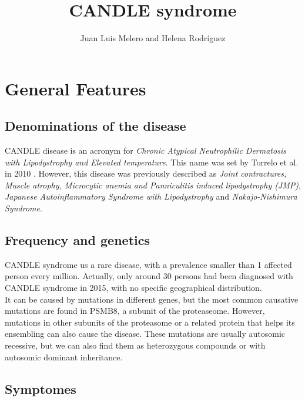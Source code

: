 \documentclass[a4paper,10pt]{report}
\title{CANDLE syndrome}
\author{Juan Luis Melero and Helena Rodríguez}
\begin{document}
\maketitle
\tableofcontents

\begin{abstract}
\end{abstract}

\chapter{General Features}

\section{Denominations of the disease}

CANDLE disease is an acronym for \textit{Chronic Atypical Neutrophilic Dermatosis with Lipodystrophy and Elevated temperature}. This name was set by Torrelo et al. in 2010 \cite{Torrelo2010}.
However, this disease was previously described as \textit{Joint contractures, Muscle atrophy, Microcytic anemia and Panniculitis induced lipodystrophy (JMP)}, \textit{Japanese Autoinflammatory Syndrome with Lipodystrophy} and \textit{Nakajo-Nishimura Syndrome}.

\section{Frequency and genetics}

CANDLE syndrome us a rare disease, with a prevalence smaller than 1 affected person every million. Actually, only around 30 persons had been diagnosed with CANDLE syndrome in 2015, with no specific geographical distribution.\\

It can be caused by mutations in different genes, but the most common causative mutations are found in PSMB8, a subunit of the proteaseome. However, mutations in other subunits of the proteasome or a related protein that helps its ensembling can also cause the disease. These mutations are usually autosomic recessive, but we can also find them as heterozygous compounds or with autosomic dominant inheritance.

\section{Symptomes}
\end{document}
